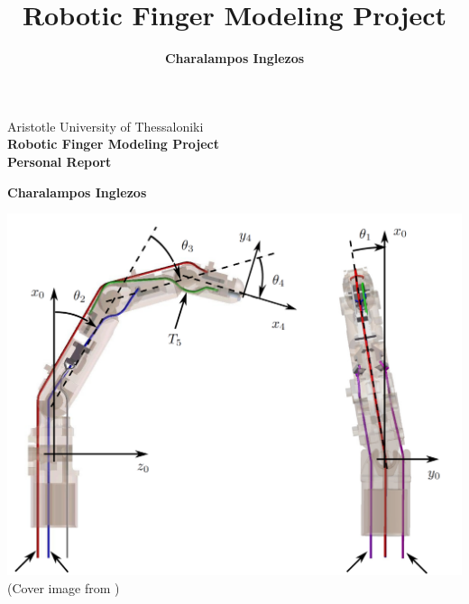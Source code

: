 \documentclass[a4paper,12pt]{article}
\title{Robotic Finger Modeling Project}
\author{\textbf{Charalampos Inglezos}}
\begin{document}
\begin{titlepage}
    \thispagestyle{cover} %
    \centering
    \vspace*{4pt}
    \Large
    Aristotle University of Thessaloniki\\
    \Huge
    \textbf{Robotic Finger Modeling Project}\\
    \vspace{8pt}
    \LARGE\textbf{Personal Report}
    
    \vspace{1cm}
    
    \LARGE
    \textbf{Charalampos Inglezos}
    
    \vspace{2cm}
    
    \includegraphics[width=\textwidth]{img/cover.png}
    \small (Cover image from \cite{borghesan2010design})\\
    \vspace{1.5cm} 
    \large
    \\
    
\end{titlepage}

\fancyhf{} %
\renewcommand{\headrulewidth}{0pt} %
\restoregeometry
\newpage

\tableofcontents
\newpage
\end{document}
